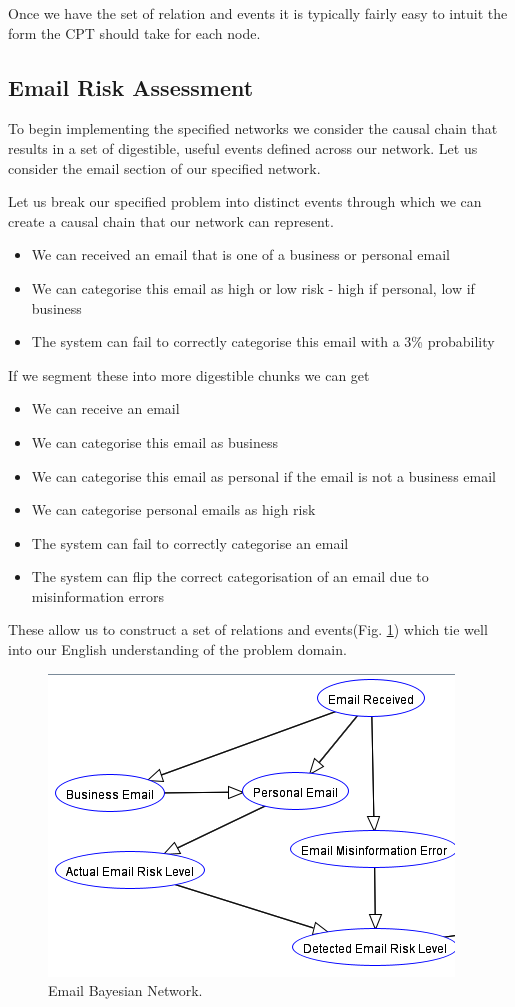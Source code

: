 \documentclass[10pt,a4paper]{article}
\begin{document}
Once we have the set of relation and events it is typically fairly easy to intuit the form the CPT should take for each node.

\subsection{Email Risk Assessment}
To begin implementing the specified networks we consider the causal chain that results in a set of digestible, useful events defined across our network. Let us consider the email section of our specified network. 

Let us break our specified problem into distinct events through which we can create a causal chain that our network can represent.

\begin{itemize}
\item We can received an email that is one of a business or personal email
\item We can categorise this email as high or low risk - high if personal, low if business
\item The system can fail to correctly categorise this email with a 3\% probability
\end{itemize}

If we segment these into more digestible chunks we can get

\begin{itemize}
\item We can receive an email
\item We can categorise this email as business
\item We can categorise this email as personal if the email is not a business email
\item We can categorise personal emails as high risk
\item The system can fail to correctly categorise an email
\item The system can flip the correct categorisation of an email due to misinformation errors
\end{itemize}

These allow us to construct a set of relations and events(Fig. \ref{fig:email_network}) which tie well into our English understanding of the problem domain.

\begin{figure}
\centering
  \includegraphics{email_network.png}
  \caption{Email Bayesian Network.}
  \label{fig:email_network}
\end{figure}
\end{document}
